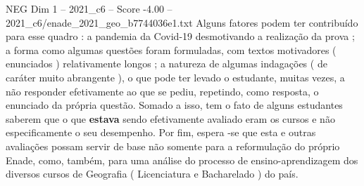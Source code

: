 \begin{textsample}{NEG Dim 1 – 2021\_c6 – Score -4.00 – 2021\_c6/enade\_2021\_geo\_b7744036e1.txt}
Alguns fatores podem ter contribuído para esse quadro : a pandemia da Covid-19 desmotivando a realização da prova ; a forma como algumas questões foram formuladas, com textos motivadores ( enunciados ) relativamente longos ; a natureza de algumas indagações ( de caráter muito abrangente ), o que pode ter levado o estudante, muitas vezes, a não responder efetivamente ao que se pediu, repetindo, como resposta, o enunciado da própria questão.
Somado a isso, tem o fato de alguns estudantes saberem que o que \textbf{estava} sendo efetivamente avaliado eram os cursos e não especificamente o seu desempenho.
Por fim, espera -se que esta e outras avaliações possam servir de base não somente para a reformulação do próprio Enade, como, também, para uma análise do processo de ensino-aprendizagem dos diversos cursos de Geografia ( Licenciatura e Bacharelado ) do país.

\end{textsample}
